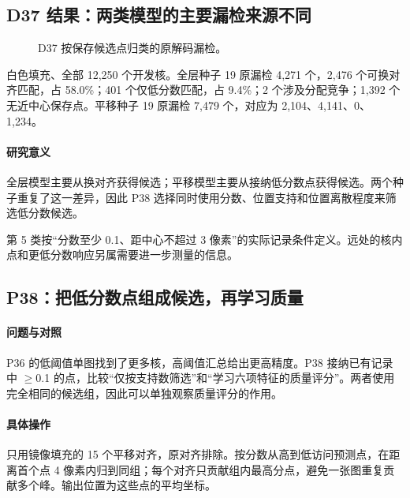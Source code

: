 \documentclass[
  12pt,
  fontset=fandol]{ctexart}
\begin{document}
\subsection{D37 结果：两类模型的主要漏检来源不同}\label{chapter7}
\begin{figure}[H]\centering\caption{D37 按保存候选点归类的原解码漏检。}\end{figure}
白色填充、全部 12,250 个开发核。全层种子 19 原漏检 4,271 个，2,476 个可换对齐匹配，占 58.0\%；401 个仅低分数匹配，占 9.4\%；2 个涉及分配竞争；1,392 个无近中心保存点。平移种子 19 原漏检 7,479 个，对应为 2,104、4,141、0、1,234。

\paragraph{研究意义}
全层模型主要从换对齐获得候选；平移模型主要从接纳低分数点获得候选。两个种子重复了这一差异，因此 P38 选择同时使用分数、位置支持和位置离散程度来筛选低分数候选。

第 5 类按“分数至少 0.1、距中心不超过 3 像素”的实际记录条件定义。远处的核内点和更低分数响应另属需要进一步测量的信息。

\subsection{P38：把低分数点组成候选，再学习质量}\label{chapter8}
\paragraph{问题与对照}
P36 的低阈值单图找到了更多核，高阈值汇总给出更高精度。P38 接纳已有记录中 \ensuremath{\geq}0.1 的点，比较“仅按支持数筛选”和“学习六项特征的质量评分”。两者使用完全相同的候选组，因此可以单独观察质量评分的作用。

\paragraph{具体操作}
只用镜像填充的 15 个平移对齐，原对齐排除。按分数从高到低访问预测点，在距离首个点 4 像素内归到同组；每个对齐只贡献组内最高分点，避免一张图重复贡献多个峰。输出位置为这些点的平均坐标。
\end{document}

